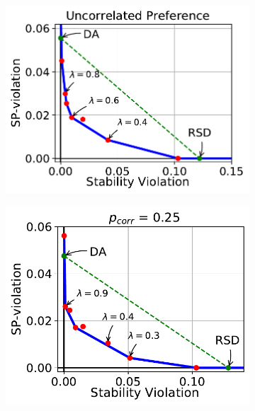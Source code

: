 \documentclass[11pt,letterpaper]{article}
\theoremstyle{definition}
\begin{document}
\begin{figure}[h!]
\centering
\begin{subfigure}[b]{0.49\textwidth}
\centering
\includegraphics[scale=0.65]{plots/p_0.20_corr_0.00.pdf}
\end{subfigure}
\begin{subfigure}[b]{0.49\textwidth}
\centering
\includegraphics[scale=0.65]{plots/p_0.20_corr_0.25.pdf}
\end{subfigure}
\begin{subfigure}[b]{0.49\textwidth}
\centering

\end{subfigure}
\end{figure}
\end{document}
